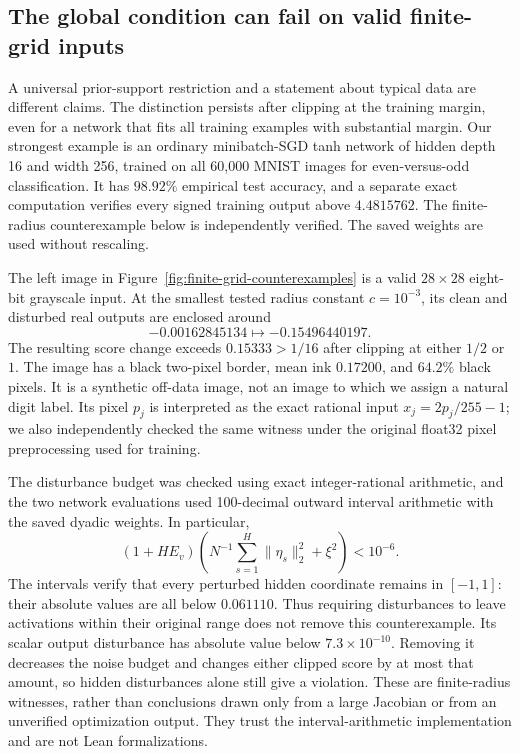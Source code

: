\subsection{The global condition can fail on valid finite-grid inputs}
\label{sec:finite-grid-counterexamples}
A universal prior-support restriction and a statement about typical data are different claims.  The distinction persists after clipping at the training margin, even for a network that fits all training examples with substantial margin.  Our strongest example is an ordinary minibatch-SGD tanh network of hidden depth 16 and width 256, trained on all 60,000 MNIST images for even-versus-odd classification.  It has $98.92\%$ empirical test accuracy, and a separate exact computation verifies every signed training output above $4.4815762$.  The finite-radius counterexample below is independently verified.  The saved weights are used without rescaling.

The left image in Figure~\ref{fig:finite-grid-counterexamples} is a valid $28\times28$ eight-bit grayscale input.  At the smallest tested radius constant $c=10^{-3}$, its clean and disturbed real outputs are enclosed around
\[
 -0.00162845134\longmapsto-0.15496440197.
\]
The resulting score change exceeds $0.15333>1/16$ after clipping at either $1/2$ or $1$.  The image has a black two-pixel border, mean ink $0.17200$, and $64.2\%$ black pixels.  It is a synthetic off-data image, not an image to which we assign a natural digit label.  Its pixel $p_j$ is interpreted as the exact rational input $x_j=2p_j/255-1$; we also independently checked the same witness under the original float32 pixel preprocessing used for training.

The disturbance budget was checked using exact integer-rational arithmetic, and the two network evaluations used 100-decimal outward interval arithmetic with the saved dyadic weights.  In particular,
\[
 (1+H E_v)\left(N^{-1}\sum_{s=1}^{H}\|\eta_s\|_2^2+\xi^2\right)
 <10^{-6}.
\]
The intervals verify that every perturbed hidden coordinate remains in $[-1,1]$: their absolute values are all below $0.061110$.  Thus requiring disturbances to leave activations within their original range does not remove this counterexample.  Its scalar output disturbance has absolute value below $7.3\times10^{-10}$.  Removing it decreases the noise budget and changes either clipped score by at most that amount, so hidden disturbances alone still give a violation.  These are finite-radius witnesses, rather than conclusions drawn only from a large Jacobian or from an unverified optimization output.  They trust the interval-arithmetic implementation and are not Lean formalizations.

